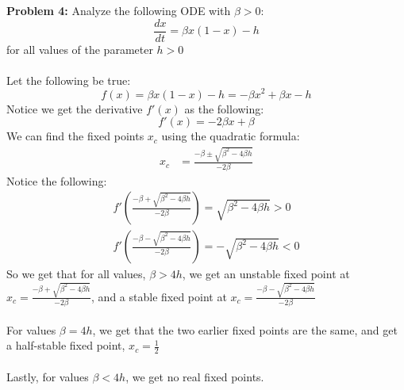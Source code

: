 \documentclass[11pt]{article}
\newenvironment{problem}[1]{\textbf{Problem #1: }}{\newpage}
\begin{document}
	\begin{problem}{4}
		Analyze the following ODE with $\beta > 0$:
		$$\frac{dx}{dt} = \beta x(1 - x) - h$$
		for all values of the parameter $h > 0$
		\\ \\
		Let the following be true:
			$$f(x) = \beta x(1 - x) - h = -\beta x^2 + \beta x - h$$
		Notice we get the derivative $f'(x)$ as the following:
			$$f'(x) = -2\beta x + \beta$$
		We can find the fixed points $x_c$ using the quadratic formula:
		\begin{align*}
			x_c &= \frac{-\beta \pm \sqrt{\beta^2 - 4\beta h}}{-2\beta}
		\end{align*}
		Notice the following:
		\begin{align*}
			f'\left(\frac{-\beta + \sqrt{\beta^2 - 4\beta h}}{-2\beta}\right) = \sqrt{\beta^2 - 4\beta h} > 0 \\
			f'\left(\frac{-\beta - \sqrt{\beta^2 - 4\beta h}}{-2\beta}\right) = -\sqrt{\beta^2 - 4\beta h} < 0
		\end{align*}
		So we get that for all values, $\beta > 4h$, we get an unstable fixed point at $x_c = \frac{-\beta + \sqrt{\beta^2 - 4\beta h}}{-2\beta}$, and a stable fixed point at $x_c = \frac{-\beta - \sqrt{\beta^2 - 4\beta h}}{-2\beta}$
		\\ \\
		For values $\beta = 4h$, we get that the two earlier fixed points are the same, and get a half-stable fixed point, $x_c = \frac{1}{2}$ 
		\\ \\
		Lastly, for values $\beta < 4h$, we get no real fixed points.
	\end{problem}
\end{document}
